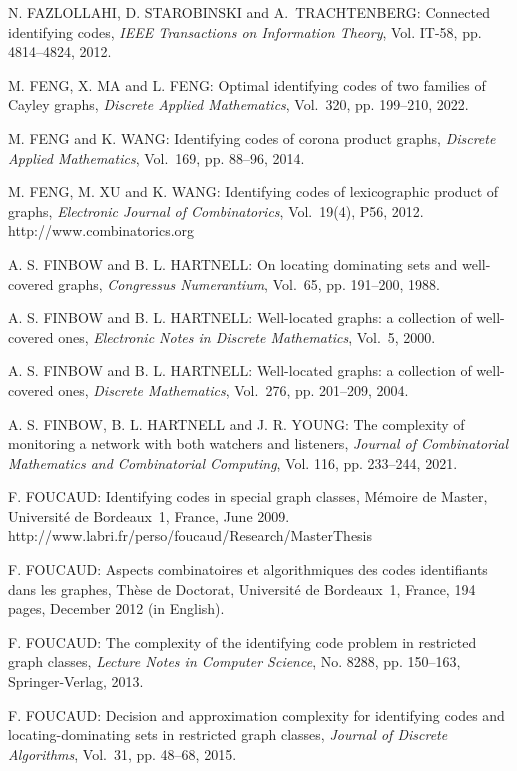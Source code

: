 \begin{thebibliography}{999}
N. FAZLOLLAHI, D. STAROBINSKI and A.~TRACHTENBERG: Connected identifying codes, {\it IEEE Transactions on Information Theory}, Vol. IT-58, pp. 4814--4824, 2012.

M. FENG, X. MA and L. FENG: Optimal identifying codes of two families of Cayley graphs, {\it Discrete Applied Mathematics}, Vol.~320, pp. 199--210, 2022.

M. FENG and K. WANG: Identifying codes of corona product graphs, {\it Discrete Applied Mathematics}, Vol.~169, pp. 88--96, 2014.

M. FENG, M. XU and K. WANG: Identifying codes of lexicographic product of graphs, {\it Electronic Journal of Combinatorics}, Vol.~19(4), P56, 2012.\\
http://www.combinatorics.org

A. S. FINBOW and B. L. HARTNELL: On locating dominating sets and well-covered graphs, {\it Congressus Numerantium}, Vol.~65, pp. 191--200, 1988.

A. S. FINBOW and B. L. HARTNELL: Well-located graphs: a collection of well-covered ones, {\it Electronic Notes in Discrete Mathematics}, Vol.~5, 2000.

A. S. FINBOW and B. L. HARTNELL: Well-located graphs: a collection of well-covered ones, {\it Discrete Mathematics}, Vol.~276, pp. 201--209, 2004.

A. S. FINBOW, B. L. HARTNELL and J. R. YOUNG: The complexity of monitoring a network with both watchers and listeners, {\it Journal of Combinatorial Mathematics and Combinatorial Computing}, Vol. 116, pp. 233--244, 2021.

F. FOUCAUD: Identifying codes in special graph classes, M\'emoire de Master, Universit\'e de Bordeaux~1, France, June 2009.\\http://www.labri.fr/perso/foucaud/Research/MasterThesis

F. FOUCAUD: Aspects combinatoires et algorithmiques des codes identifiants dans les graphes, Th\`ese de Doctorat, Universit\'e de Bordeaux~1, France, 194 pages, December 2012 (in English).

F. FOUCAUD: The complexity of the  identifying code problem in restricted graph classes, {\it Lecture Notes in Computer Science}, No. 8288, pp. 150--163, Springer-Verlag, 2013.

F. FOUCAUD: Decision and approximation complexity for identifying codes and locating-dominating sets in restricted graph classes, {\it Journal of Discrete Algorithms}, Vol.~31, pp. 48--68, 2015.


\end{thebibliography}
